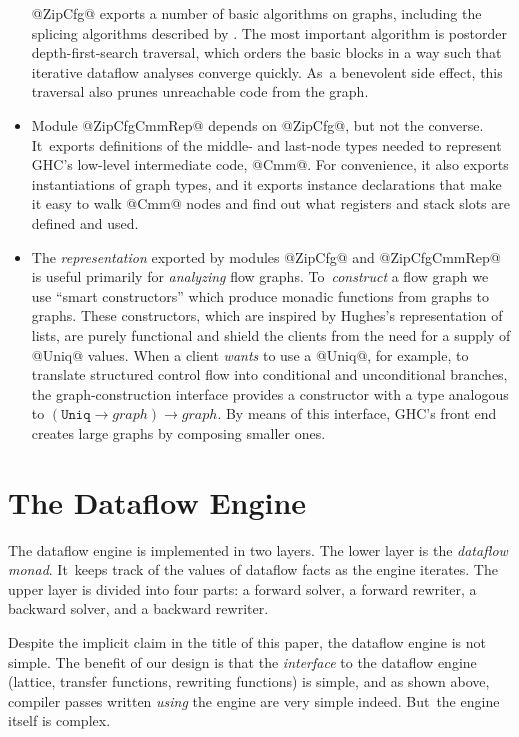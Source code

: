 \documentclass[blockstyle,preprint,nocopyrightspace]{sigplanconf}
\newcommand\arrow{\rightarrow}
\let\cite\citep
\newcommand\seclabel[1]{\label{sec:#1}}
\begin{document}
\begin{itemize}
@ZipCfg@ exports a number of basic algorithms on graphs, including the
splicing algorithms described by
\citet{ramsey-dias:applicative-flow-graph}. 
The most important algorithm is postorder depth-first-search
traversal, which orders the basic blocks in a way such that iterative
dataflow analyses converge quickly.
As~a benevolent side effect, this traversal also prunes unreachable
code from the graph.
\item
Module @ZipCfgCmmRep@ depends on @ZipCfg@, but not the converse.
It~exports definitions of the middle- and last-node types needed to
represent GHC's low-level intermediate code, @Cmm@.
For convenience, it also exports instantiations of graph types,
and it exports instance declarations that make it easy to walk @Cmm@
nodes and find out what registers and stack slots are defined and
used.
\item
The \emph{representation} exported by
modules @ZipCfg@ and @ZipCfgCmmRep@ is useful primarily
for \emph{analyzing} flow graphs.
To~\emph{construct} a flow graph we use ``smart constructors'' which
produce monadic functions from graphs to graphs.
These constructors, which are inspired by Hughes's \citeyearpar{hughes:novel-lists}
representation of lists, are purely functional and shield the clients
from the need for a supply of @Uniq@ values.
When a client \emph{wants} to use a @Uniq@, for example, to translate
structured control flow into conditional and unconditional branches,
the graph-construction interface provides a constructor with a type
analogous to $(\mathtt{Uniq} \arrow \mathit{graph}) \arrow \mathit{graph}$.
By means of this interface, GHC's front end creates large graphs by
composing smaller ones.
\end{itemize}




\section{The Dataflow Engine}
\seclabel{engine}

The dataflow engine is implemented in two layers.
The lower layer is the \emph{dataflow monad}.
It~keeps track of the values of dataflow facts as the engine iterates.
The upper layer is divided into four parts:
a forward solver, a forward rewriter,
a backward solver, and a backward rewriter.

Despite the implicit claim in the title of this paper,
the dataflow engine is not simple.
The benefit of our design is that the \emph{interface} to the dataflow
engine (lattice, transfer functions, rewriting functions) is simple,
and as shown above, compiler passes written \emph{using} the engine
are very simple indeed.
But~the engine itself is complex.
\end{document}
